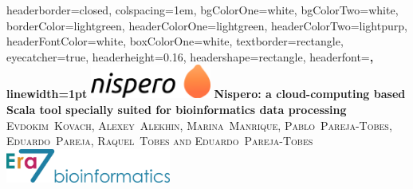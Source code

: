 \documentclass[portrait,a0paper,fontscale=0.285]{baposter} %
\begin{document}
\begin{poster}
{
headerborder=closed, %
colspacing=1em, %
bgColorOne=white, %
bgColorTwo=white, %
borderColor=lightgreen, %
headerColorOne=lightgreen, %
headerColorTwo=lightpurp, %
headerFontColor=white, %
boxColorOne=white, %
textborder=rectangle, %
eyecatcher=true, %
headerheight=0.16\textheight, %
headershape=rectangle, %
headerfont=\Large\bf\textsc, %
linewidth=1pt %
}
%
{\includegraphics[height=3em]{nispero.png}} %
{\bf{Nispero: a cloud-computing based Scala tool specially suited for bioinformatics data
processing}}
{\textsc{Evdokim~Kovach, Alexey~Alekhin, Marina~Manrique, Pablo~Pareja-Tobes, Eduardo~Pareja, Raquel~Tobes and Eduardo~Pareja-Tobes}} %
{\includegraphics[height=3em]{era7.png}} %




\end{poster}
\end{document}
